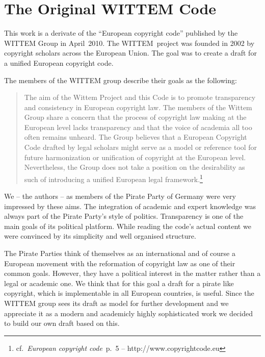 \section{The Original WITTEM Code}

This work is a derivate of the ``European copyright code'' published by the WITTEM Group in April~2010. The WITTEM~project was founded in 2002 by copyright scholars across the European Union. The goal was to create a draft for a unified European copyright code. 

The members of the WITTEM group describe their goals as the following:

\begin{quote}
	The aim of the Wittem Project and this Code is to promote transparency and
consistency in European copyright law. The members of the Wittem Group
share a concern that the process of copyright law making at the European
level lacks transparency and that the voice of academia all too often remains
unheard. The Group believes that a European Copyright Code drafted by legal
scholars might serve as a model or reference tool for future harmonization
or unification of copyright at the European level. Nevertheless, the Group
does not take a position on the desirability as such of introducing a unified
European legal framework.\footnote{cf.~\textit{European copyright code}~p.~5 -- http://www.copyrightcode.eu}
\end{quote}

We -- the authors -- as members of the Pirate Party of Germany were very impressed by these aims. The integration of academic and expert knowledge was always part of the Pirate Party's style of politics. Transparency is one of the main goals of its political platform. While reading the code's actual content we were convinced by its simplicity and well organised structure. 

The Pirate Parties think of themselves as an international and of course a European movement with the reformation of copyright law as one of their common goals. However, they have a political interest in the matter rather than a legal or academic one. We think that for this goal a draft for a pirate like copyright, which is implementable in all European countries, is useful. Since the WITTEM group sees its draft as model for further development and we appreciate it as a modern and academicly highly sophisticated work we decided to build our own draft based on this. 